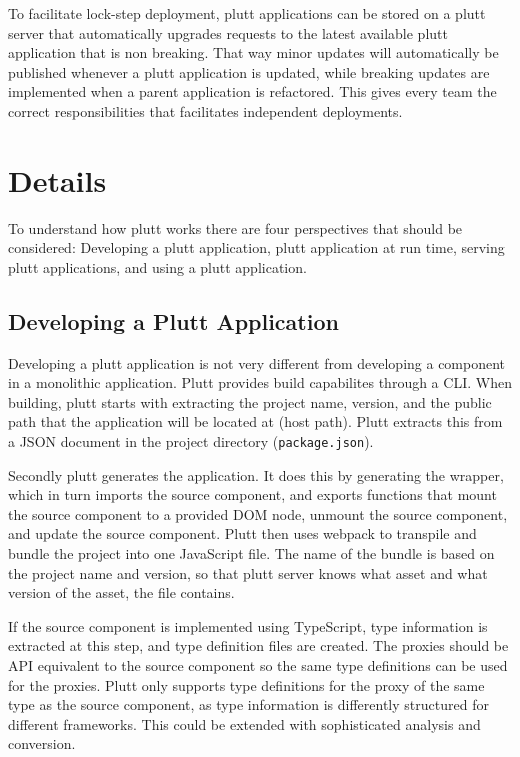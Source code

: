 To facilitate lock-step deployment, plutt applications can be stored on a plutt server that automatically upgrades requests to the latest available plutt application that is non breaking. That way minor updates will automatically be published whenever a plutt application is updated, while breaking updates are implemented when a parent application is refactored. This gives every team the correct responsibilities that facilitates independent deployments.


\section{Details}
To understand how plutt works there are four perspectives that should be considered: Developing a plutt application, plutt application at run time, serving plutt applications, and using a plutt application.

\subsection{Developing a Plutt Application}

Developing a plutt application is not very different from developing a component in a monolithic application. Plutt provides build capabilites through a \ac{CLI}. When building, plutt starts with extracting the project name, version, and the public path that the application will be located at (host path). Plutt extracts this from a JSON document in the project directory (\texttt{package.json}).

Secondly plutt generates the application. It does this by generating the wrapper, which in turn imports the source component, and exports functions that mount the source component to a provided \ac{DOM} node, unmount the source component, and update the source component. Plutt then uses webpack to transpile and bundle the project into one JavaScript file. The name of the bundle is based on the project name and version, so that plutt server knows what asset and what version of the asset, the file contains.

If the source component is implemented using TypeScript, type information is extracted at this step, and type definition files are created. The proxies should be API equivalent to the source component so the same type definitions can be used for the proxies. Plutt only supports type definitions for the proxy of the same type as the source component, as type information is differently structured for different frameworks. This could be extended with sophisticated analysis and conversion.

